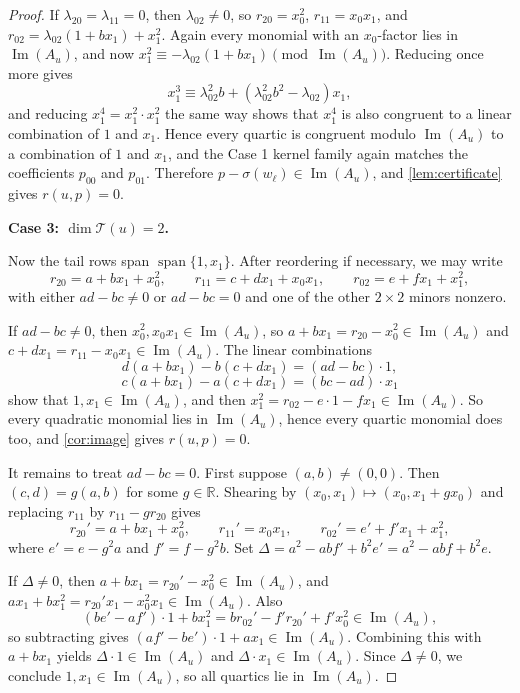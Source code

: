 \documentclass[10pt]{article}
\theoremstyle{definition}
\newcommand{\R}{\mathbb{R}}
\DeclareMathOperator{\mspan}{span}
\DeclareMathOperator{\imag}{Im}
\newcommand{\Span}{\mspan}
\newcommand{\im}{\imag}
\newcommand{\sig}{\sigma}
\newcommand{\Tail}{\mathcal{T}}
\begin{document}
\begin{proof}
If \(\lambda_{20}=\lambda_{11}=0\), then \(\lambda_{02}\neq 0\), so
\(r_{20}=x_0^2\), \(r_{11}=x_0x_1\), and
\(r_{02}=\lambda_{02}(1+b x_1)+x_1^2\). Again every monomial with an
\(x_0\)-factor lies in \(\im(A_u)\), and now
\(x_1^2\equiv -\lambda_{02}(1+b x_1)\pmod{\im(A_u)}\). Reducing once more gives
\[
  x_1^3\equiv \lambda_{02}^2 b+(\lambda_{02}^2 b^2-\lambda_{02})x_1,
\]
and reducing \(x_1^4=x_1^2\cdot x_1^2\) the same way shows that \(x_1^4\) is
also congruent to a linear combination of \(1\) and \(x_1\). Hence every
quartic is congruent modulo \(\im(A_u)\) to a combination of \(1\) and \(x_1\),
and the Case 1 kernel family again matches the coefficients \(p_{00}\) and
\(p_{01}\). Therefore \(p-\sig(w_\ell)\in \im(A_u)\), and
\cref{lem:certificate} gives \(r(u,p)=0\).

\smallskip
\noindent\textbf{Case 3: \(\dim \Tail(u)=2\).}

Now the tail rows span \(\Span\{1,x_1\}\). After reordering if necessary, we may
write
\[
  r_{20}=a+b x_1+x_0^2,\qquad
  r_{11}=c+d x_1+x_0x_1,\qquad
  r_{02}=e+f x_1+x_1^2,
\]
with either \(ad-bc\neq 0\) or \(ad-bc=0\) and one of the other \(2\times2\)
minors nonzero.

If \(ad-bc\neq 0\), then \(x_0^2,x_0x_1\in \im(A_u)\), so
\(a+b x_1=r_{20}-x_0^2\in \im(A_u)\) and
\(c+d x_1=r_{11}-x_0x_1\in \im(A_u)\). The linear combinations
\[
  d(a+b x_1)-b(c+d x_1)=(ad-bc)\cdot 1,
\]
\[
  c(a+b x_1)-a(c+d x_1)=(bc-ad)\cdot x_1
\]
show that \(1,x_1\in \im(A_u)\), and then
\(x_1^2=r_{02}-e\cdot 1-f x_1\in \im(A_u)\). So every quadratic monomial lies
in \(\im(A_u)\), hence every quartic monomial does too, and \cref{cor:image}
gives \(r(u,p)=0\).

It remains to treat \(ad-bc=0\). First suppose \((a,b)\neq (0,0)\). Then
\((c,d)=g(a,b)\) for some \(g\in \R\). Shearing by
\((x_0,x_1)\mapsto (x_0,x_1+g x_0)\) and replacing \(r_{11}\) by
\(r_{11}-g r_{20}\) gives
\[
  r_{20}'=a+b x_1+x_0^2,\qquad r_{11}'=x_0x_1,\qquad
  r_{02}'=e'+f' x_1+x_1^2,
\]
where \(e'=e-g^2a\) and \(f'=f-g^2b\). Set
\(\Delta=a^2-a b f'+b^2 e'=a^2-a b f+b^2 e\).

If \(\Delta\neq 0\), then \(a+b x_1=r_{20}'-x_0^2\in \im(A_u)\), and
\(a x_1+b x_1^2=r_{20}'x_1-x_0^2x_1\in \im(A_u)\). Also
\[
  (b e'-a f')\cdot 1+b x_1^2=b r_{02}'-f' r_{20}'+f' x_0^2\in \im(A_u),
\]
so subtracting gives \((a f'-b e')\cdot 1+a x_1\in \im(A_u)\). Combining this
with \(a+b x_1\) yields \(\Delta\cdot 1\in \im(A_u)\) and
\(\Delta\cdot x_1\in \im(A_u)\). Since \(\Delta\neq 0\), we conclude
\(1,x_1\in \im(A_u)\), so all quartics lie in \(\im(A_u)\).


\end{proof}
\end{document}

